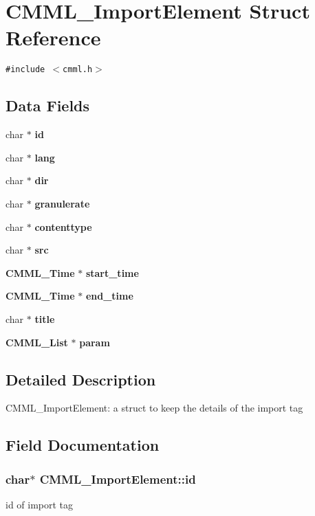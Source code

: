 \section{CMML\_\-Import\-Element Struct Reference}
\label{structCMML__ImportElement}
{\tt \#include $<$cmml.h$>$}

\subsection*{Data Fields}
\begin{CompactItemize}
\item 
char $\ast$ {\bf id}
\item 
char $\ast$ {\bf lang}
\item 
char $\ast$ {\bf dir}
\item 
char $\ast$ {\bf granulerate}
\item 
char $\ast$ {\bf contenttype}
\item 
char $\ast$ {\bf src}
\item 
{\bf CMML\_\-Time} $\ast$ {\bf start\_\-time}
\item 
{\bf CMML\_\-Time} $\ast$ {\bf end\_\-time}
\item 
char $\ast$ {\bf title}
\item 
{\bf CMML\_\-List} $\ast$ {\bf param}
\end{CompactItemize}


\subsection{Detailed Description}
CMML\_\-Import\-Element: a struct to keep the details of the import tag 



\subsection{Field Documentation}
\subsubsection{\setlength{\rightskip}{0pt plus 5cm}char$\ast$ {\bf CMML\_\-Import\-Element::id}}\label{structCMML__ImportElement_o0}


id of import tag 
